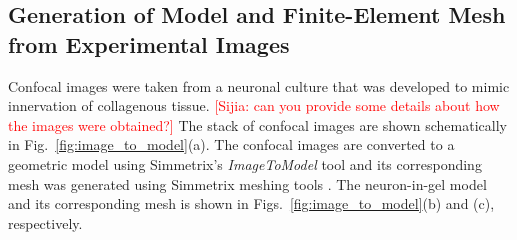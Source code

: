 \documentclass[10pt]{asme2ej}
\begin{document}
\subsection{Generation of Model and Finite-Element Mesh from Experimental Images}
Confocal images were taken from a neuronal culture that was developed to mimic innervation of collagenous tissue. \textcolor{red}{[Sijia: can you provide some details about how the images were obtained?]} The stack of confocal images are shown schematically in Fig.\ \ref{fig:image_to_model}(a). The confocal images are converted to a geometric model using Simmetrix's \textit{ImageToModel} tool \cite{Klaas_chapter, Klaas_conference, simmetrix} and its corresponding mesh was generated using Simmetrix meshing tools \cite{simmetrix,Shephard:2000vc}. The neuron-in-gel model and its corresponding mesh is shown in Figs.\ \ref{fig:image_to_model}(b) and (c), respectively. 
%
\end{document}
